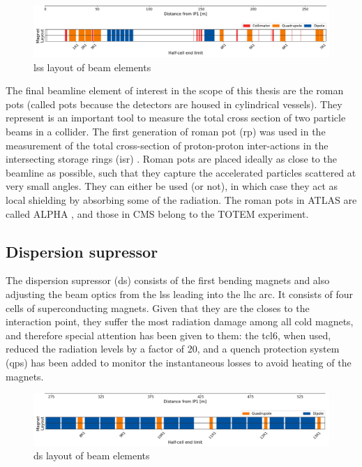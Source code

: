 \documentclass[encoding=utf8,british]{tumphthesis}
\begin{document}
\begin{figure}[H]
    \centering
    \includegraphics[width=1.0\linewidth]{figures/FLUKA_GEOMETRY_LSS.png}
    \caption{\acrshort{lss} layout of beam elements}
    \label{fig:LSS-layout}
\end{figure}

\newpage

The final beamline element of interest in the scope of this thesis are the roman pots \cite{Oriunno:1078513} (called pots because the detectors are housed in cylindrical vessels). They represent is an important tool to measure the total cross section of two particle beams in a collider. The first generation of roman pot (\acrshort{rp}) was used in the measurement of the total cross-section of proton-proton inter-actions in the intersecting storage rings (\acrshort{isr}) \cite{Fabjan:2312567}. Roman pots are placed ideally as close to the beamline as possible, such that they capture the accelerated particles scattered at very small angles. They can either be used (or not), in which case they act as local shielding by absorbing some of the radiation. The roman pots in ATLAS are called ALPHA \cite{ALFA-rp}, and those in CMS belong to the TOTEM \cite{TOTEM} experiment.

\subsection{Dispersion supressor}

The dispersion supressor (\acrshort{ds}) consists of the first bending magnets and also adjusting the beam optics from the \acrshort{lss} leading into the \acrshort{lhc} arc. It consists of four cells of superconducting magnets. Given that they are the closes to the interaction point, they suffer the most radiation damage among all cold magnets, and therefore special attention has been given to them: the \acrshort{tcl}6, when used, reduced the radiation levels by a factor of 20, and a quench protection system (\acrshort{qps}) \cite{Coull:259538} has been added to monitor the instantaneous losses to avoid heating of the magnets.


\begin{figure}[H]
    \centering
    \includegraphics[width=1.0\linewidth]{figures/FLUKA_GEOMETRY_DS.png}
    \caption{\acrshort{ds} layout of beam elements}
    \label{fig:DS-layout}
\end{figure}
\end{document}
